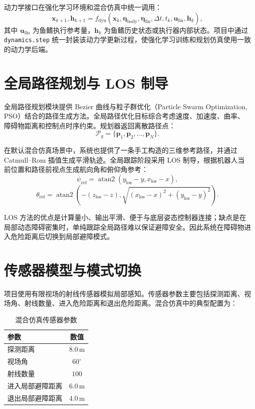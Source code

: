 \documentclass[UTF8,a4paper,12pt]{ctexart}
\begin{document}
动力学接口在强化学习环境和混合仿真中统一调用：
\begin{equation}
\bm{x}_{k+1}, \bm{h}_{k+1}
= f_{\mathrm{dyn}}\left(
\bm{x}_{k}, \bm{\eta}_{\mathrm{body}}, \bm{\eta}_{\mathrm{fin}},
\Delta t, t_k, \bm{u}_{\mathrm{fin}}, \bm{h}_{k}
\right),
\end{equation}
其中 $\bm{u}_{\mathrm{fin}}$ 为鱼鳍执行参考量，$\bm{h}_k$ 为鱼鳍历史状态或执行器内部状态。项目中通过 \texttt{dynamics.step} 统一封装该动力学更新过程，使强化学习训练和规划仿真使用一致的动力学后端。

\section{全局路径规划与 LOS 制导}

全局路径规划模块提供 Bezier 曲线与粒子群优化（Particle Swarm Optimization, PSO）结合的路径生成方法\cite{kennedy1995particle}。全局路径优化目标综合考虑速度、加速度、曲率、障碍物距离和控制点时序约束。规划器返回离散路径点：
\begin{equation}
\mathcal{P}_{g} = \{\bm{p}_1, \bm{p}_2, \ldots, \bm{p}_N\}.
\end{equation}

在默认混合仿真场景中，系统也提供了一条手工构造的三维参考路径，并通过 Catmull--Rom 插值生成平滑轨迹。全局跟踪阶段采用 LOS 制导，根据机器人当前位置和路径前视点生成航向角和俯仰角参考：
\begin{equation}
\psi_{\mathrm{ref}} = \operatorname{atan2}(y_{\mathrm{los}} - y, x_{\mathrm{los}} - x),
\end{equation}
\begin{equation}
\theta_{\mathrm{ref}} =
\operatorname{atan2}\left(
-(z_{\mathrm{los}} - z),
\sqrt{(x_{\mathrm{los}} - x)^2 + (y_{\mathrm{los}} - y)^2}
\right).
\end{equation}

LOS 方法的优点是计算量小、输出平滑、便于与底层姿态控制器连接；缺点是在局部动态障碍密集时，单纯跟踪全局路径难以保证避障安全。因此系统在障碍物进入危险距离后切换到局部避障模式。

\section{传感器模型与模式切换}

项目使用有限视场的射线传感器模拟局部感知。传感器参数主要包括探测距离、视场角、射线数量、进入危险距离和退出危险距离。混合仿真中的典型配置为：

\begin{table}[htbp]
\centering
\caption{混合仿真传感器参数}
\label{tab:sensor}
\begin{tabular}{lc}
\toprule
参数 & 数值 \\
\midrule
探测距离 & $8.0\,\mathrm{m}$ \\
视场角 & $60^\circ$ \\
射线数量 & $100$ \\
进入局部避障距离 & $6.0\,\mathrm{m}$ \\
退出局部避障距离 & $4.0\,\mathrm{m}$ \\
\bottomrule
\end{tabular}
\end{table}
\end{document}
